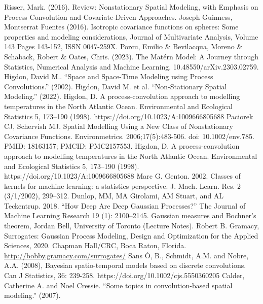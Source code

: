 \documentclass[12pt]{article}
\begin{document}
\begin{thebibliography}{20}
 Risser, Mark. (2016). Review: Nonstationary Spatial Modeling, with Emphasis on Process Convolution and Covariate-Driven Approaches. 
 Joseph Guinness, Montserrat Fuentes (2016). Isotropic covariance functions on spheres: Some properties and modeling considerations, Journal of Multivariate Analysis, Volume 143
Pages 143-152, ISSN 0047-259X.
 Porcu, Emilio \& Bevilacqua, Moreno \& Schaback, Robert \& Oates, Chris. (2023). The Mat\'ern Model: A Journey through Statistics, Numerical Analysis and Machine Learning. 10.48550/arXiv.2303.02759. 
 Higdon, David M.. “Space and Space-Time Modeling using Process Convolutions.” (2002).
 Higdon, David M. et al. “Non-Stationary Spatial Modeling.” (2022).
 Higdon, D. A process-convolution approach to modelling temperatures in the North Atlantic Ocean. Environmental and Ecological Statistics 5, 173–190 (1998). https://doi.org/10.1023/A:1009666805688
 Paciorek CJ, Schervish MJ. Spatial Modelling Using a New Class of Nonstationary Covariance Functions. Environmetrics. 2006;17(5):483-506. doi: 10.1002/env.785. PMID: 18163157; PMCID: PMC2157553.
 Higdon, D. A process-convolution approach to modelling temperatures in the North Atlantic Ocean. Environmental and Ecological Statistics 5, 173–190 (1998). https://doi.org/10.1023/A:1009666805688
 Marc G. Genton. 2002. Classes of kernels for machine learning: a statistics perspective. J. Mach. Learn. Res. 2 (3/1/2002), 299–312.
 Dunlop, MM, MA Girolami, AM Stuart, and AL Teckentrup. 2018. “How Deep Are Deep Gaussian Processes?” The Journal of Machine Learning Research 19 (1): 2100–2145.
 Gaussian measures and Bochner’s theorem, Jordan Bell, University of Toronto (Lecture Notes). 
 Robert B. Gramacy, Surrogates: Gaussian Process Modeling, Design and Optimization for the Applied Sciences, 2020. Chapman Hall/CRC, Boca Raton, Florida. \url{http://bobby.gramacy.com/surrogates/}
 Sans Ó, B., Schmidt, A.M. and Nobre, A.A. (2008), Bayesian spatio-temporal models based on discrete convolutions. Can J Statistics, 36: 239-258. https://doi.org/10.1002/cjs.5550360205
 Calder, Catherine A. and Noel Cressie. “Some topics in convolution-based spatial modeling.” (2007).
\end{thebibliography}
\end{document}
